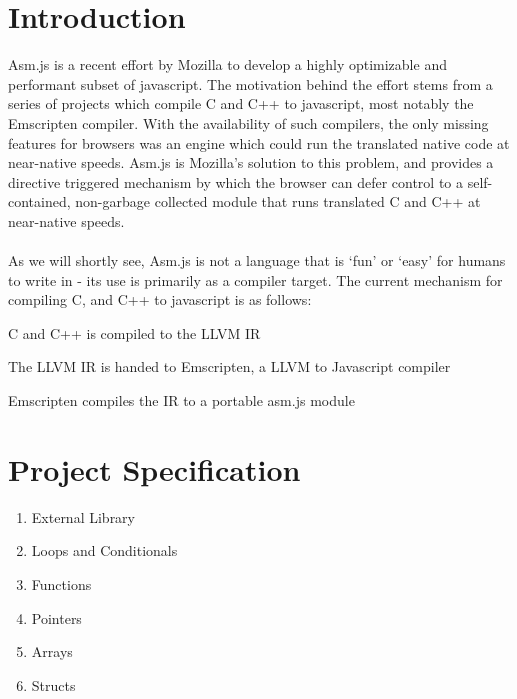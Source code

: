 \documentclass[twoside]{article}
\begin{document}
\begin{multicols}{2} %

\section{Introduction}


Asm.js is a recent effort by Mozilla to develop a highly optimizable and performant 
subset of javascript. The motivation behind the effort stems from a series of projects which
compile C and C++ to javascript, most notably the Emscripten compiler. With the availability of such
compilers, the only missing features for browsers was an engine which could run the 
translated native code at near-native speeds. Asm.js is Mozilla's solution to this problem,
and provides a directive triggered mechanism by which the browser can defer control to a 
self-contained, non-garbage collected module that runs translated C and C++ at near-native speeds. \\
\\
As we will shortly see, Asm.js is not a language that is `fun' or `easy' for humans to write in - 
its use is primarily as a compiler target. The current mechanism for compiling C, and C++ to
javascript is as follows: 

\begin{compactitem}
  \item C and C++ is compiled to the LLVM IR
  \item The LLVM IR is handed to Emscripten, a LLVM to Javascript compiler
  \item Emscripten compiles the IR to a portable asm.js module
\end{compactitem}



\section{Project Specification}

\begin{enumerate}
  \item External Library
  \item Loops and Conditionals
  \item Functions
  \item Pointers
  \item Arrays
  \item Structs
\end{enumerate}


\end{multicols}
\end{document}
